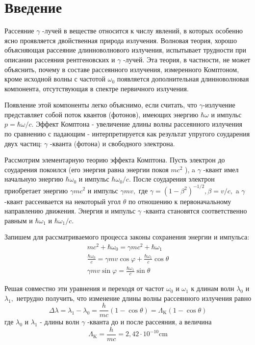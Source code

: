 \documentclass[a4paper, 12pt]{article}
\begin{document}
\tableofcontents
\newpage

\section{Введение} 
    Рассеяние $\gamma$ -лучей в веществе относится к числу явлений, 
    в которых особенно ясно проявляется двойственная природа излучения. 
    Волновая теория, хорошо объясняющая рассеяние длинноволнового излучения, 
    испытывает трудности при описании рассеяния рентгеновских и $\gamma$ -лучей. 
    Эта теория, в частности, не может объяснить, почему в составе рассеянного излучения, 
    измеренного Комптоном, кроме исходной волны с частотой $\omega_{0}$ появляется дополнительная длинноволновая компонента, 
    отсутствующая в спектре первичного излучения.

    Появление этой компоненты легко объяснимо, если считать, что $\gamma$-излучение представляет собой поток квантов (фотонов), 
    имеющих энергию $\hbar \omega$ и импульс $p=\hbar \omega / c .$ 
    Эффект Комптона - увеличение длины волны рассеянного излучения по сравнению с падающим - интерпретируется 
    как результат упругого соударения двух частиц: $\gamma$ -кванта (фотона) и свободного электрона.

    Рассмотрим элементарную теорию эффекта Комптона. 
    Пусть электрон до соударения покоился (его энергия равна энергии покоя $m c^{2}$ ), 
    a $\gamma$ -квант имел начальную энергию $\hbar \omega_{0}$ и импульс $\hbar \omega_{0} / c .$ 
    После соударения электрон приобретает энергию $\gamma m c^{2}$ и импульс $\gamma m v,$ 
    где $\gamma=\left(1-\beta^{2}\right)^{-1 / 2}, \beta=v / c,$ a $\gamma$ -квант рассеивается 
    на некоторый угол $\theta$ по отношению к первоначальному направлению движения. 
    Энергия и импульс $\gamma$ -кванта становятся соответственно равным 
    и $\hbar \omega_{1}$ и $\hbar \omega_{1} / c$. 
   
    Запишем для рассматриваемого процесса законы сохранения энергии и импульса:
    \[
        \begin{array}{c}
            m c^{2}+\hbar \omega_{0}=\gamma m c^{2}+\hbar \omega_{1} \\
            \frac{\hbar \omega_{0}}{c}=\gamma m v \cos \varphi+\frac{\hbar \omega_{1}}{c} \cos \theta \\
            \gamma m v \sin \varphi=\frac{\hbar \omega_{1}}{c} \sin \theta
        \end{array}
    \]

    Решая совместно эти уравнения и переходя от частот $\omega_{0}$ и $\omega_{1}$ 
    к длинам волн $\lambda_{0}$ и $\lambda_{1},$ нетрудно получить, что изменение длины волны рассеянного излучения равно
    \begin{equation}
    \Delta \lambda=\lambda_{1}-\lambda_{0}=\frac{h}{m c}(1-\cos \theta)=\Lambda_{\mathrm{K}}(1-\cos \theta)
    \end{equation}
    где $\lambda_{0}$ и $\lambda_{1}$ - длины волн $\gamma$ -кванта до и после рассеяния, а величина
    \[
        \Lambda_{\mathrm{K}}=\frac{h}{m c}=2,42 \cdot 10^{-10} \mathrm{cm}
    \]
\end{document}

